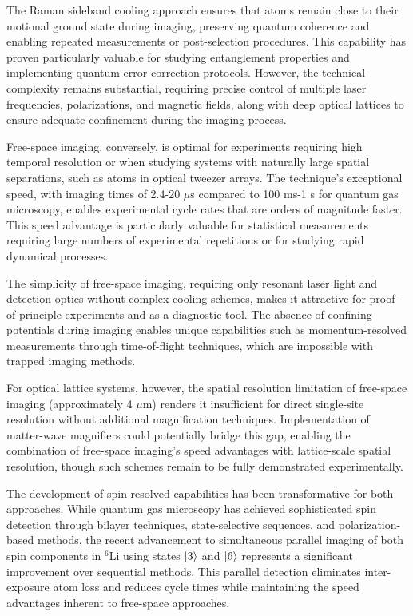 The Raman sideband cooling approach ensures that atoms remain close to their motional ground state during imaging, preserving quantum coherence and enabling repeated measurements or post-selection procedures. This capability has proven particularly valuable for studying entanglement properties and implementing quantum error correction protocols. However, the technical complexity remains substantial, requiring precise control of multiple laser frequencies, polarizations, and magnetic fields, along with deep optical lattices to ensure adequate confinement during the imaging process.

Free-space imaging, conversely, is optimal for experiments requiring high temporal resolution or when studying systems with naturally large spatial separations, such as atoms in optical tweezer arrays. The technique's exceptional speed, with imaging times of 2.4-20 $\mu$s compared to 100 ms-1 s for quantum gas microscopy, enables experimental cycle rates that are orders of magnitude faster. This speed advantage is particularly valuable for statistical measurements requiring large numbers of experimental repetitions or for studying rapid dynamical processes.

The simplicity of free-space imaging, requiring only resonant laser light and detection optics without complex cooling schemes, makes it attractive for proof-of-principle experiments and as a diagnostic tool. The absence of confining potentials during imaging enables unique capabilities such as momentum-resolved measurements through time-of-flight techniques, which are impossible with trapped imaging methods.

For optical lattice systems, however, the spatial resolution limitation of free-space imaging (approximately 4 $\mu$m) renders it insufficient for direct single-site resolution without additional magnification techniques. Implementation of matter-wave magnifiers could potentially bridge this gap, enabling the combination of free-space imaging's speed advantages with lattice-scale spatial resolution, though such schemes remain to be fully demonstrated experimentally.

The development of spin-resolved capabilities has been transformative for both approaches. While quantum gas microscopy has achieved sophisticated spin detection through bilayer techniques, state-selective sequences, and polarization-based methods, the recent advancement to simultaneous parallel imaging of both spin components in $^6$Li using states $\left| 3 \right\rangle$ and $\left| 6 \right\rangle$ represents a significant improvement over sequential methods. This parallel detection eliminates inter-exposure atom loss and reduces cycle times while maintaining the speed advantages inherent to free-space approaches.

